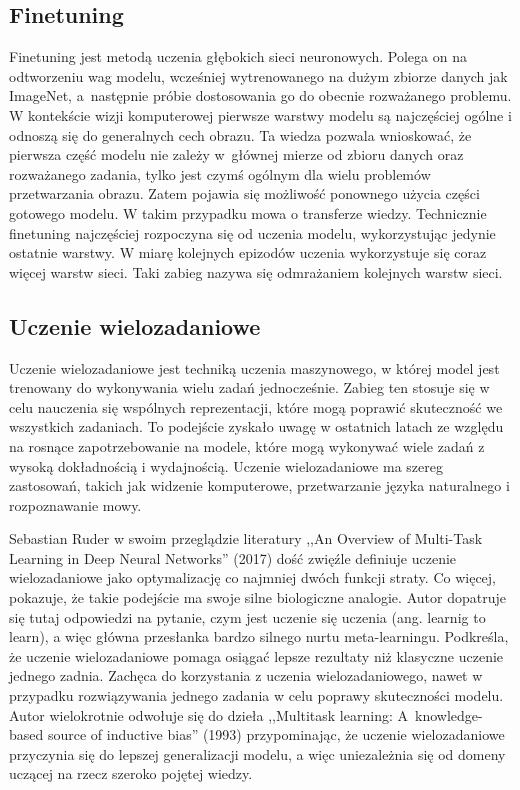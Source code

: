 \subsection{Finetuning}
Finetuning jest metodą uczenia głębokich sieci neuronowych. Polega on na odtworzeniu wag modelu, wcześniej wytrenowanego na dużym zbiorze danych jak ImageNet, a~następnie próbie dostosowania go do obecnie rozważanego problemu. W kontekście wizji komputerowej pierwsze warstwy modelu są najczęściej ogólne i odnoszą się do generalnych cech obrazu. Ta wiedza pozwala wnioskować, że pierwsza część modelu nie zależy w~głównej mierze od zbioru danych oraz rozważanego zadania, tylko jest czymś ogólnym dla wielu problemów przetwarzania obrazu. Zatem pojawia się możliwość ponownego użycia części gotowego modelu. W takim przypadku mowa o transferze wiedzy. Technicznie finetuning najczęściej rozpoczyna się od uczenia modelu, wykorzystując jedynie ostatnie warstwy. W miarę kolejnych epizodów uczenia wykorzystuje się coraz więcej warstw sieci. Taki zabieg nazywa się odmrażaniem kolejnych warstw sieci.
\subsection{Uczenie wielozadaniowe}
Uczenie wielozadaniowe jest techniką uczenia maszynowego, w której model jest trenowany do wykonywania wielu zadań jednocześnie. Zabieg ten stosuje się w celu nauczenia się wspólnych reprezentacji, które mogą poprawić skuteczność we wszystkich zadaniach. To podejście zyskało uwagę w ostatnich latach ze względu na rosnące zapotrzebowanie na modele, które mogą wykonywać wiele zadań z wysoką dokładnością i wydajnością. Uczenie wielozadaniowe ma szereg zastosowań, takich jak widzenie komputerowe, przetwarzanie języka naturalnego i rozpoznawanie mowy.

Sebastian Ruder w swoim przeglądzie literatury ,,An Overview of Multi-Task Learning in Deep Neural Networks'' (2017) \cite{ruder2017overview} dość zwięźle definiuje uczenie wielozadaniowe jako optymalizację co najmniej dwóch funkcji straty. Co więcej, pokazuje, że takie podejście ma swoje silne biologiczne analogie. Autor dopatruje się tutaj odpowiedzi na pytanie, czym jest uczenie się uczenia (ang. learnig to learn), a więc główna przesłanka bardzo silnego nurtu meta-learningu. Podkreśla, że uczenie wielozadaniowe pomaga osiągać lepsze rezultaty niż klasyczne uczenie jednego zadnia. Zachęca do korzystania z uczenia wielozadaniowego, nawet w przypadku rozwiązywania jednego zadania w celu poprawy skuteczności modelu. Autor wielokrotnie odwołuje się do dzieła ,,Multitask learning: A~knowledge-based source of inductive bias'' (1993) \cite{caruana1993multitask} przypominając, że uczenie wielozadaniowe przyczynia się do lepszej generalizacji modelu, a więc uniezależnia się od domeny uczącej na rzecz szeroko pojętej wiedzy.

